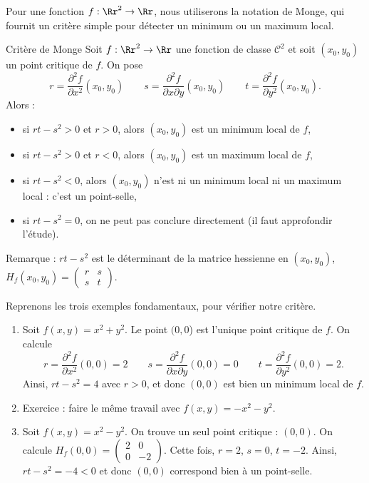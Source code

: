 Pour une fonction $f : \Rr^2 \to \Rr$, nous utiliserons la notation de Monge, qui fournit un critère simple pour détecter un minimum ou un maximum local.
\begin{theoreme}{Critère de Monge}{}
Soit $f : \Rr^2 \to \Rr$ une fonction de classe $\mathcal{C}^2$ et soit $(x_0,y_0)$ un point critique de $f$.
 On pose 
$$
	r=\frac{\partial^2 f}{\partial x^2}(x_0,y_0)  
	\qquad 
	s=\frac{\partial^2 f}{\partial x \partial y}(x_0,y_0)
	\qquad
	t=\frac{\partial^2 f}{\partial y^2}(x_0,y_0).
$$
Alors :
\begin{itemize}
	\item si $rt-s^2>0$ et $r>0$, alors $(x_0,y_0)$ est un minimum local de $f$,
	\item si $rt-s^2>0$ et $r<0$, alors $(x_0,y_0)$ est un maximum local de $f$,
	\item si $rt-s^2<0$, alors $(x_0,y_0)$ n'est ni un minimum local ni un maximum local : c'est un point-selle,
	 \item si $rt-s^2=0$, on ne peut pas conclure directement (il faut approfondir l'étude).
\end{itemize}
\end{theoreme}

Remarque : $rt-s^2$ est le déterminant de la matrice hessienne en $(x_0,y_0)$, $H_f(x_0,y_0) = \begin{pmatrix}r&s\\s&t\end{pmatrix}$.

\begin{exemple}{}{}
Reprenons les trois exemples fondamentaux, pour vérifier notre critère.
\begin{enumerate}
	\item Soit  $f(x,y)=x^2+y^2$. Le point $(0,0$) est l'unique point critique de $f$.
On calcule 
$$r=\frac{\partial^2 f}{\partial x^2}(0,0)=2 
\qquad 
s=\frac{\partial^2 f}{\partial x \partial y}(0,0)=0
\qquad
t=\frac{\partial^2 f}{\partial y^2}(0,0)=2.$$
Ainsi, $rt-s^2 = 4$ avec $r>0$, et donc $(0,0)$ est bien un minimum local de $f$.
  \item Exercice : faire le même travail avec $f(x,y)=-x^2-y^2$. 
  \item Soit $f(x,y)=x^2-y^2$. On trouve un seul point critique : $(0,0)$. 
   On calcule $H_f(0,0) = \left(\begin{smallmatrix}2&0\\0&-2\end{smallmatrix}\right)$.
   Cette fois, $r=2$, $s=0$, $t=-2$. Ainsi, $rt-s^2 = -4 < 0$ et donc $(0,0)$ correspond bien à un point-selle.
\end{enumerate}

\end{exemple}


